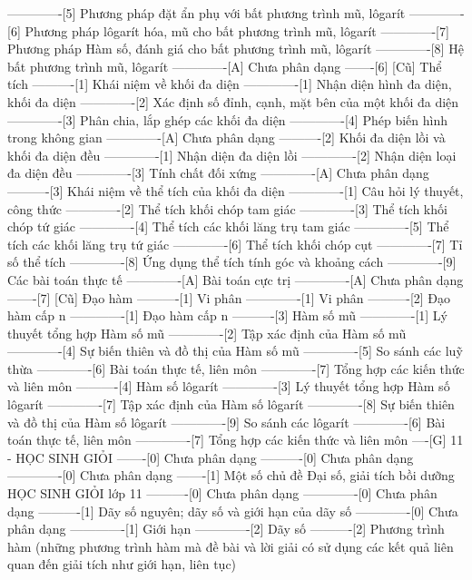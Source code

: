 -------------[5] Phương pháp đặt ẩn phụ với bất phương trình mũ, lôgarít
-------------[6] Phương pháp lôgarít hóa, mũ cho bất phương trình mũ, lôgarít
-------------[7] Phương pháp Hàm số, đánh giá cho bất phương trình mũ, lôgarít
-------------[8] Hệ bất phương trình mũ, lôgarít
-------------[A] Chưa phân dạng
-------[6] [Cũ] Thể tích
----------[1] Khái niệm về khối đa diện
-------------[1] Nhận diện hình đa diện, khối đa diện
-------------[2] Xác định số đỉnh, cạnh, mặt bên của một khối đa diện
-------------[3] Phân chia, lắp ghép các khối đa diện
-------------[4] Phép biến hình trong không gian
-------------[A] Chưa phân dạng
----------[2] Khối đa diện lồi và khối đa diện đều
-------------[1] Nhận diện đa diện lồi
-------------[2] Nhận diện loại đa diện đều
-------------[3] Tính chất đối xứng
-------------[A] Chưa phân dạng
----------[3] Khái niệm về thể tích của khối đa diện
-------------[1] Câu hỏi lý thuyết, công thức
-------------[2] Thể tích khối chóp tam giác
-------------[3] Thể tích khối chóp tứ giác
-------------[4] Thể tích các khối lăng trụ tam giác
-------------[5] Thể tích các khối lăng trụ tứ giác
-------------[6] Thể tích khối chóp cụt
-------------[7] Tỉ số thể tích
-------------[8] Ứng dụng thể tích tính góc và khoảng cách
-------------[9] Các bài toán thực tế
-------------[A] Bài toán cực trị
-------------[A] Chưa phân dạng
-------[7] [Cũ] Đạo hàm
----------[1] Vi phân
-------------[1] Vi phân
----------[2] Đạo hàm cấp n
-------------[1] Đạo hàm cấp n
----------[3] Hàm số mũ
-------------[1] Lý thuyết tổng hợp Hàm số mũ
-------------[2] Tập xác định của Hàm số mũ
-------------[4] Sự biến thiên và đồ thị của Hàm số mũ
-------------[5] So sánh các luỹ thừa
-------------[6] Bài toán thực tế, liên môn
-------------[7] Tổng hợp các kiến thức và liên môn
----------[4] Hàm số lôgarít
-------------[3] Lý thuyết tổng hợp Hàm số lôgarít
-------------[7] Tập xác định của Hàm số lôgarít
-------------[8] Sự biến thiên và đồ thị của Hàm số lôgarít
-------------[9] So sánh các lôgarít
-------------[6] Bài toán thực tế, liên môn
-------------[7] Tổng hợp các kiến thức và liên môn
----[G] 11 - HỌC SINH GIỎI
-------[0] Chưa phân dạng
----------[0] Chưa phân dạng
-------------[0] Chưa phân dạng
-------[1] Một số chủ đề Đại số, giải tích bồi dưỡng HỌC SINH GIỎI lớp 11
----------[0] Chưa phân dạng
-------------[0] Chưa phân dạng
----------[1] Dãy số nguyên; dãy số và giới hạn của dãy số
-------------[0] Chưa phân dạng
-------------[1] Giới hạn
-------------[2] Dãy số
----------[2] Phương trình hàm (những phương trình hàm mà đề bài và lời giải có sử dụng các kết quả liên quan đến giải tích như giới hạn, liên tục)
